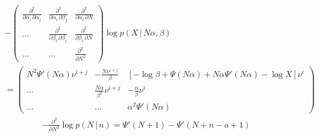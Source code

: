 \documentclass[11pt]{article}
\newcommand{\cond}{\,|\,}
\newcommand{\secDeriv}[1]{\frac{\partial^2}{\partial #1^2}} %
\newcommand{\secPartial}[2]{\frac{\partial^2}{\partial #1 \, \partial #2}} %
\begin{document}
 \begin{align}
  \label{eq:hess-prediction}
  & - \left(
    \begin{array}{ccc}
      \secPartial{\alpha_i}{\alpha_j} & \secPartial{\alpha_i}{\beta_j} & \secPartial{\alpha_i}{N}\\
      \dots & \secPartial{\beta_i}{\beta_j} & \secPartial{\beta_i}{N}\\
      \dots & \dots & \secDeriv{N}
    \end{array}
  \right) \log p(X \cond N \alpha, \beta)
  \\
  &=
  \left(
    \begin{array}{ccc}
      N^2 \Psi'(N \alpha) \nu^{i+j} & -\frac{N \nu^{i+j}}{\beta} & \left[ -\log \beta +\Psi(N \alpha) + N \alpha \Psi'(N \alpha) - \log X \right] \nu^{i}\\
      \dots &  \frac{N\alpha}{\beta^2} \nu^{i+j} & -\frac{\alpha}{\beta} \nu^{i} \\
      \dots & \dots & \alpha^2 \Psi'(N \alpha)
    \end{array}
  \right)
\end{align}
\begin{align}
  \label{eq:hess-nb}
   - \secDeriv{N} \log p(N \cond n) = \Psi'(N+1) - \Psi'(N+n-a+1)
\end{align}



\end{document}
